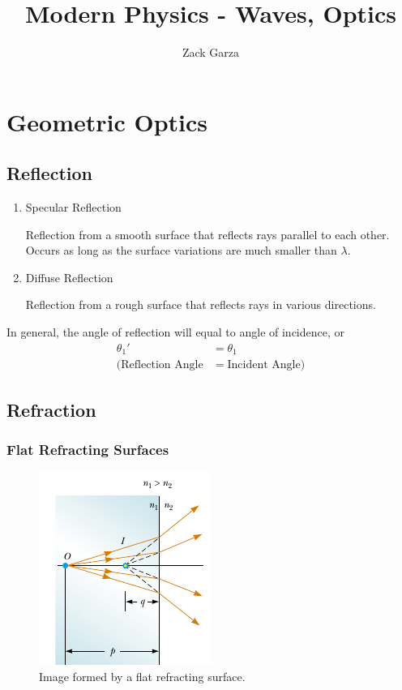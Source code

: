 \documentclass[a4paper,10pt]{report}
\begin{document}
\title{Modern Physics - Waves, Optics}
\author{Zack Garza}
\maketitle
\tableofcontents

\chapter{Geometric Optics}
\section{Reflection}
\begin{enumerate}
 \item Specular Reflection

 Reflection from a smooth surface that reflects rays parallel to each other. Occurs as long as the surface variations are much smaller than $\lambda$.

 \item Diffuse Reflection

 Reflection from a rough surface that reflects rays in various directions.

\end{enumerate}

In general, the angle of reflection will equal to angle of incidence, or
\begin{align*}
 \theta_{1}' &= \theta_1 \\
 (\text{Reflection Angle} &= \text{Incident Angle})
\end{align*}


\section{Refraction}
\subsection{Flat Refracting Surfaces}

\begin{figure}[h!]
  \begin{centering}
  \begin{center}
  \includegraphics{./flat_refracting.png}
  \caption{Image formed by a flat refracting surface.}
  \label{fig:flat_refracting}
  \end{center}
  \par\end{centering}
  \end{figure}
\end{document}
